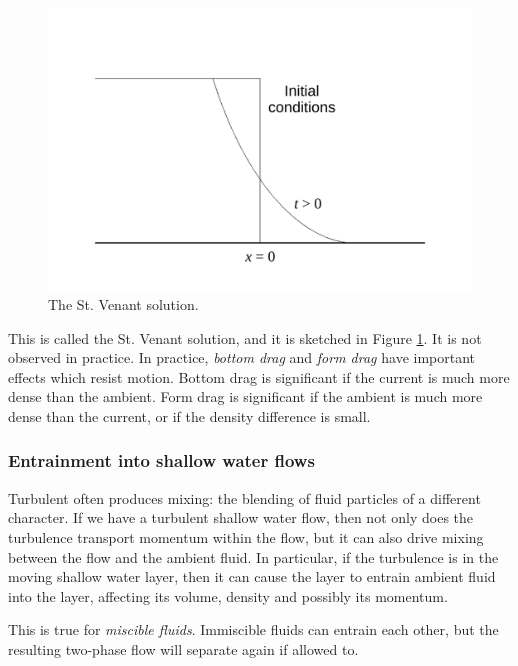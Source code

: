 \begin{figure}
\begin{center}
\includegraphics[width=16cm]{st-venant-solution.pdf}
\caption{The St. Venant solution.}
\label{fig:st-venant-solution}
\end{center}
\end{figure}

This is called the St. Venant solution, and it is sketched in Figure \ref{fig:st-venant-solution}. It is not observed in practice. In practice, \textit{bottom drag} and \textit{form drag} have important effects which resist motion. Bottom drag is significant if the current is much more dense than the ambient. Form drag is significant if the ambient is much more dense than the current, or if the density difference is small.

\subsubsection{Entrainment into shallow water flows}

Turbulent often produces mixing: the blending of fluid particles of a different character. If we have a turbulent shallow water flow, then not only does the turbulence transport momentum within the flow, but it can also drive mixing between the flow and the ambient fluid. In particular, if the turbulence is in the moving shallow water layer, then it can cause the layer to entrain ambient fluid into the layer, affecting its volume, density and possibly its momentum. 

This is true for \textit{miscible fluids}. Immiscible fluids can entrain each other, but the resulting two-phase flow will separate again if allowed to. 

